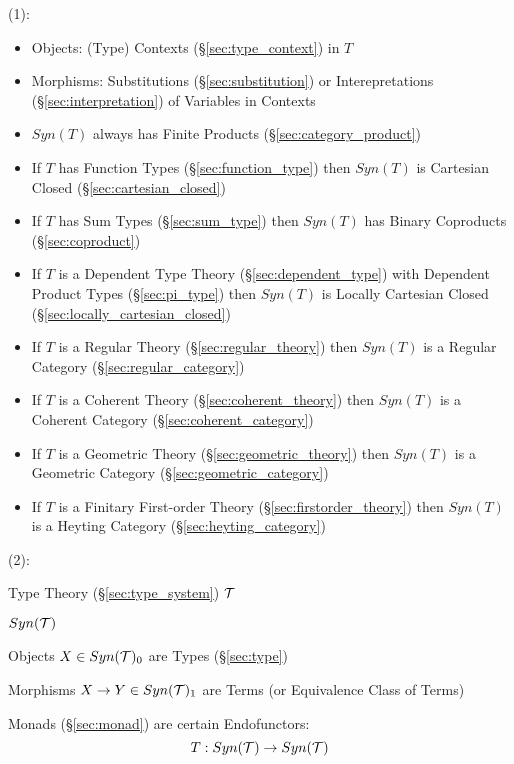 (1):

\begin{itemize}
  \item Objects: (Type) Contexts (\S\ref{sec:type_context}) in $T$
  \item Morphisms: Substitutions (\S\ref{sec:substitution}) or
    Interepretations (\S\ref{sec:interpretation}) of Variables in
    Contexts
\end{itemize}

\begin{itemize}
  \item $Syn(T)$ always has Finite Products
    (\S\ref{sec:category_product})
  \item If $T$ has Function Types (\S\ref{sec:function_type}) then
    $Syn(T)$ is Cartesian Closed (\S\ref{sec:cartesian_closed})
  \item If $T$ has Sum Types (\S\ref{sec:sum_type}) then $Syn(T)$ has
    Binary Coproducts (\S\ref{sec:coproduct})
  \item If $T$ is a Dependent Type Theory (\S\ref{sec:dependent_type})
    with Dependent Product Types (\S\ref{sec:pi_type}) then $Syn(T)$
    is Locally Cartesian Closed (\S\ref{sec:locally_cartesian_closed})
  \item If $T$ is a Regular Theory (\S\ref{sec:regular_theory}) then
    $Syn(T)$ is a Regular Category (\S\ref{sec:regular_category})
  \item If $T$ is a Coherent Theory (\S\ref{sec:coherent_theory}) then
    $Syn(T)$ is a Coherent Category (\S\ref{sec:coherent_category})
  \item If $T$ is a Geometric Theory (\S\ref{sec:geometric_theory}) then
    $Syn(T)$ is a Geometric Category (\S\ref{sec:geometric_category})
  \item If $T$ is a Finitary First-order Theory
    (\S\ref{sec:firstorder_theory}) then $Syn(T)$ is a Heyting
    Category (\S\ref{sec:heyting_category})
\end{itemize}

(2):

Type Theory (\S\ref{sec:type_system}) $\mathcal{T}$

$Syn(\mathcal{T})$

Objects $X \in Syn(\mathcal{T})_0$ are Types (\S\ref{sec:type})

Morphisms $X \rightarrow Y \in Syn(\mathcal{T})_1$ are Terms (or Equivalence
Class of Terms)

Monads (\S\ref{sec:monad}) are certain Endofunctors:
\[
  T : Syn(\mathcal{T}) \rightarrow Syn(\mathcal{T})
\]

